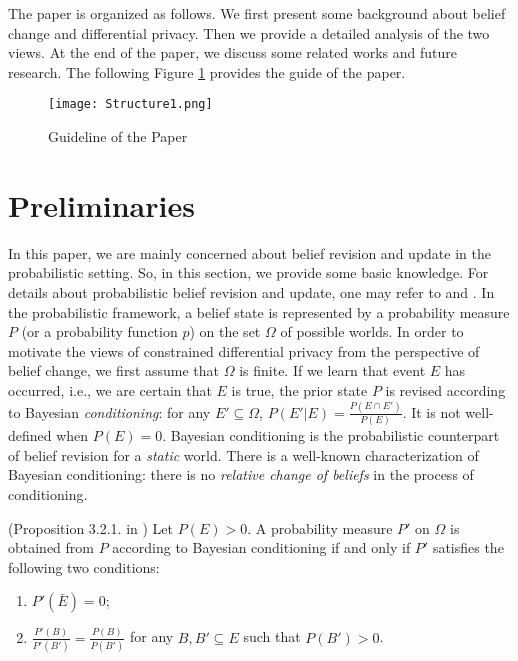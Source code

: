\documentclass[11pt]{article}
\begin{document}
The paper is organized as follows. We first present some background about belief change and differential privacy. Then we provide a detailed analysis of the two views. At the end of the paper, we discuss some related works and future research.  The following Figure \ref{fig:1} provides the guide of the paper. 

\begin{figure}[htbp]
\centering
\texttt{[image: Structure1.png]}
\caption{Guideline of the Paper}
\label{fig:1}
\end{figure}



\section{Preliminaries}\label{sec:preliminaries}


In this paper, we are mainly concerned about belief revision and update in the probabilistic setting. So, in this section, we provide some basic knowledge.  For details about probabilistic belief revision and update, one may refer to \cite{Gardenfors1988knowledge} and \cite{DuboisP93}.
In the probabilistic framework, a belief state is represented by a probability measure $P$ (or a probability function $p$) on the set $\Omega$ of possible worlds.  In order to motivate the views of constrained differential privacy from the perspective of belief change, we first assume that $\Omega$ is finite. 
If we learn that event $E$ has occurred, i.e., we are certain that $E$ is true, the prior  state $P$ is revised according to Bayesian \emph{conditioning}: for any $E' \subseteq \Omega$, $P(E' | E) =  \frac{P(E\cap E')}{P(E)}$.
It is not well-defined when $P(E)=0$.  Bayesian conditioning is the probabilistic counterpart of belief revision for a \emph{static} world. 
There is a well-known characterization of Bayesian conditioning: there is no \emph{relative change of beliefs} in the process of conditioning.

 
\begin{proposition}\label{prop:conditioning} (Proposition 3.2.1. in \cite{Halpern2017}) Let $P(E)>0$.  A probability measure $P'$ on $\Omega$ is obtained from $P$ according to Bayesian conditioning if and only if $P'$ satisfies the following two conditions:
	\begin{enumerate}
		\item $P'(\bar{E}) =0$;
		\item $\frac{P'(B)}{P'(B')} = \frac{P(B)}{P(B')} $ for any $B, B'\subseteq E$ such that $P(B') >0$. 
	\end{enumerate} 
\end{proposition} 
\end{document}
